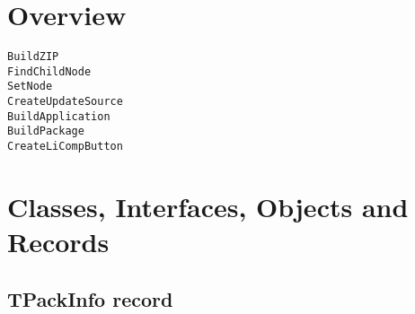 \documentclass{report}
\newif\ifpdf
\begin{document}
\section{Overview}
\begin{description}
\item[\texttt{\begin{ttfamily}TPackInfo\end{ttfamily} record}]
\end{description}
\begin{description}
\item[\texttt{BuildZIP}]
\item[\texttt{FindChildNode}]
\item[\texttt{SetNode}]
\item[\texttt{CreateUpdateSource}]
\item[\texttt{BuildApplication}]
\item[\texttt{BuildPackage}]
\item[\texttt{CreateLiCompButton}]
\end{description}
\section{Classes, Interfaces, Objects and Records}
\ifpdf
\subsection*{\large{\textbf{TPackInfo record}}\normalsize\hspace{1ex}\hrulefill}
\else
\subsection*{TPackInfo record}
\fi
\label{ipkbuild.TPackInfo}
\end{document}
